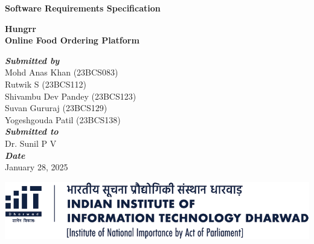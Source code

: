 \begin{titlepage}
  \begin{singlespace}
    \begin{center}

        \vspace*{\fill}
    
      \textbf{\Huge \fontfamily{\sfdefault}\selectfont Software Requirements Specification}

        \vspace*{\fill}

        \newpage
        \thispagestyle{empty}
      \textbf{\Huge \fontfamily{\sfdefault}\selectfont Hungrr} \\[0.6cm]

      \textbf{\LARGE \fontfamily{\sfdefault}\selectfont Online Food Ordering Platform}

      \vfill

      {\Large
        \textbf{\textit{\fontfamily{\sfdefault}\selectfont Submitted by}}\\[0.5cm]
        \onehalfspacing
        Mohd Anas Khan (23BCS083) \\
        Rutwik S (23BCS112) \\
        Shivambu Dev Pandey (23BCS123) \\
        Suvan Gururaj (23BCS129) \\
        Yogeshgouda Patil (23BCS138) \\[1.2cm]

        \textbf{\textit{\fontfamily{\sfdefault}\selectfont Submitted to}}\\[0.5cm]
        Dr. Sunil P V \\[1.2cm]

        \textbf{\textit{\fontfamily{\sfdefault}\selectfont Date}}\\[0.5cm]
        January 28, 2025
      }

      \vfill
      \includegraphics[width=0.8\linewidth]{./images/logo-full-light.png}

    \end{center}
  \end{singlespace}
  \restoregeometry
\end{titlepage}